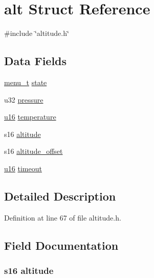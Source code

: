 \hypertarget{structalt}{\section{alt \-Struct \-Reference}
\label{structalt}
}


{\ttfamily \#include \char`\"{}altitude.\-h\char`\"{}}

\subsection*{\-Data \-Fields}
\begin{DoxyCompactItemize}
\item 
\hyperlink{project_8h_a44455c5614c38dfadce594b2228fd055}{menu\-\_\-t} \hyperlink{structalt_ac6b2518df4ca45cee089e61f152572b2}{state}
\item 
u32 \hyperlink{structalt_a3dd5bcc30ce1408a2e33442767ef6971}{pressure}
\item 
\hyperlink{main__ED__BM_8c_a9e6c91d77e24643b888dbd1a1a590054}{u16} \hyperlink{structalt_a157379ac5ab58014f162220393ace12d}{temperature}
\item 
s16 \hyperlink{structalt_aa9d8108adda93b54f8d0d62484d8f75d}{altitude}
\item 
s16 \hyperlink{structalt_aef78b8fb382f9cd58ccbec4471101398}{altitude\-\_\-offset}
\item 
\hyperlink{main__ED__BM_8c_a9e6c91d77e24643b888dbd1a1a590054}{u16} \hyperlink{structalt_a735bf6536b07682f96c9417b0f1e9079}{timeout}
\end{DoxyCompactItemize}


\subsection{\-Detailed \-Description}


\-Definition at line 67 of file altitude.\-h.



\subsection{\-Field \-Documentation}
\hypertarget{structalt_aa9d8108adda93b54f8d0d62484d8f75d}{
\subsubsection[{altitude}]{\setlength{\rightskip}{0pt plus 5cm}s16 {\bf altitude}}}\label{structalt_aa9d8108adda93b54f8d0d62484d8f75d}



